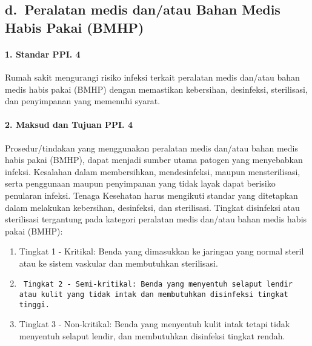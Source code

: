 \documentclass[
]{book}
\begin{document}
\hypertarget{d.-peralatan-medis-danatau-bahan-medis-habis-pakai-bmhp}{%
\subsection*{d.~Peralatan medis dan/atau Bahan Medis Habis Pakai (BMHP)}\label{d.-peralatan-medis-danatau-bahan-medis-habis-pakai-bmhp}}

\hypertarget{standar-ppi.-4}{%
\paragraph*{1. Standar PPI. 4}\label{standar-ppi.-4}}

Rumah sakit mengurangi risiko infeksi terkait peralatan medis dan/atau bahan medis habis pakai (BMHP) dengan memastikan kebersihan, desinfeksi, sterilisasi, dan penyimpanan yang memenuhi syarat.

\hypertarget{maksud-dan-tujuan-ppi.-4}{%
\paragraph*{2. Maksud dan Tujuan PPI. 4}\label{maksud-dan-tujuan-ppi.-4}}

Prosedur/tindakan yang menggunakan peralatan medis dan/atau bahan medis habis pakai (BMHP), dapat menjadi sumber utama patogen yang menyebabkan infeksi. Kesalahan dalam membersihkan, mendesinfeksi, maupun mensterilisasi, serta penggunaan maupun penyimpanan yang tidak layak dapat berisiko penularan infeksi. Tenaga Kesehatan harus mengikuti standar yang ditetapkan dalam melakukan kebersihan, desinfeksi, dan sterilisasi. Tingkat disinfeksi atau sterilisasi tergantung pada kategori peralatan medis dan/atau bahan medis habis pakai (BMHP):

\begin{enumerate}
\def\labelenumi{\alph{enumi}.}
\item
  Tingkat 1 - Kritikal: Benda yang dimasukkan ke jaringan yang normal steril atau ke sistem vaskular dan membutuhkan sterilisasi.
\item
\begin{verbatim}
 Tingkat 2 - Semi-kritikal: Benda yang menyentuh selaput lendir atau kulit yang tidak intak dan membutuhkan disinfeksi tingkat tinggi.
\end{verbatim}
\item
  Tingkat 3 - Non-kritikal: Benda yang menyentuh kulit intak tetapi tidak menyentuh selaput lendir, dan membutuhkan disinfeksi tingkat rendah.
\end{enumerate}
\end{document}
